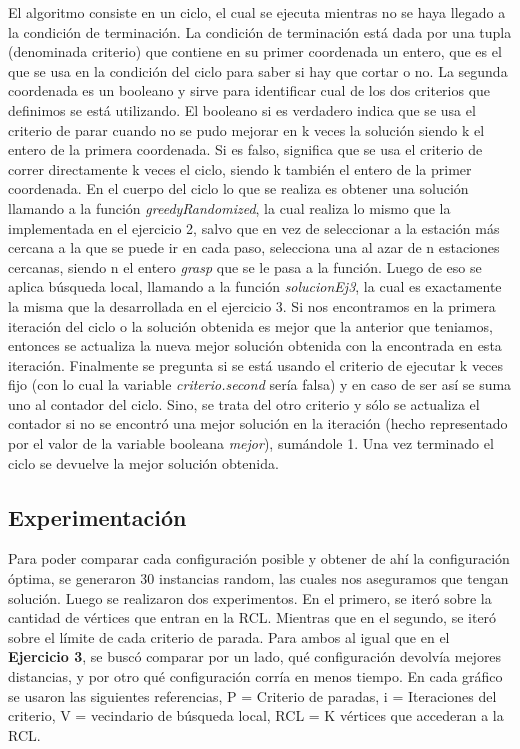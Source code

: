         El algoritmo consiste en un ciclo, el cual se ejecuta mientras no se haya llegado a la condición de terminación. La condición de terminación está dada por una tupla (denominada criterio) que contiene en su primer coordenada un entero, que es el que se usa en la condición del ciclo para saber si hay que cortar o no. La segunda coordenada es un booleano y sirve para identificar cual de los dos criterios que definimos se está utilizando. El booleano si es verdadero indica que se usa el criterio de parar cuando no se pudo mejorar en k veces la solución siendo k el entero de la primera coordenada. Si es falso, significa que se usa el criterio de correr directamente k veces el ciclo, siendo k también el entero de la primer coordenada.
        En el cuerpo del ciclo lo que se realiza es obtener una solución llamando a la función \textit{greedyRandomized}, la cual realiza lo mismo que la implementada en el ejercicio 2, salvo que en vez de seleccionar a la estación más cercana a la que se puede ir en cada paso, selecciona una al azar de n estaciones cercanas, siendo n el entero \textit{grasp} que se le pasa a la función. Luego de eso se aplica búsqueda local, llamando a la función \textit{solucionEj3}, la cual es exactamente la misma que la desarrollada en el ejercicio 3. Si nos encontramos en la primera iteración del ciclo o la solución obtenida es mejor que la anterior que teniamos, entonces se actualiza la nueva mejor solución obtenida con la encontrada en esta iteración.
        Finalmente se pregunta si se está usando el criterio de ejecutar k veces fijo (con lo cual la variable \textit{criterio.second} sería falsa) y en caso de ser así se suma uno al contador del ciclo. Sino, se trata del otro criterio y sólo se actualiza el contador si no se encontró una mejor solución en la iteración (hecho representado por el valor de la variable booleana \textit{mejor}), sumándole 1.
        Una vez terminado el ciclo se devuelve la mejor solución obtenida.

  \subsection{Experimentación}

    Para poder comparar cada configuración posible y obtener de ahí la configuración óptima, se generaron 30 instancias random, las cuales nos aseguramos que tengan solución. Luego se realizaron dos experimentos. En el primero, se iteró sobre la cantidad de vértices que entran en la RCL. Mientras que en el segundo, se iteró sobre el límite de cada criterio de parada. Para ambos al igual que en el \textbf{Ejercicio 3}, se buscó comparar por un lado, qué configuración devolvía mejores distancias, y por otro qué configuración corría en menos tiempo. En cada gráfico se usaron las siguientes referencias, P = Criterio de paradas, i = Iteraciones del criterio, V = vecindario de búsqueda local, RCL = K vértices que accederan a la RCL.

